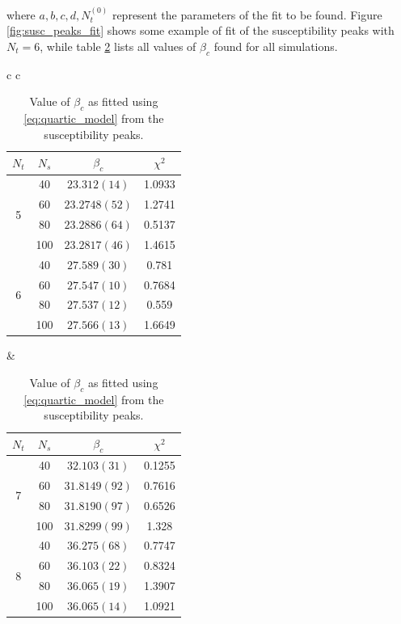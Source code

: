 \documentclass[reqno,12pt]{article}
\numberwithin{equation}{section}
\begin{document}
where $a,b,c,d,N_t^{(0)}$ represent the parameters of the fit to be found. Figure \ref{fig:susc_peaks_fit} shows
some example of fit of the susceptibility peaks with $N_t = 6$, while table \ref{table:beta_c} lists all values
of $\beta_c$ found for all simulations.

\begin{table}[h]
\begin{center}
	\begin{tabular}{c c}
		\begin{tabular}{|c|c|c|c|}
			\hline
			$N_t$ & $N_s$ & $\beta_c$ & $\chi^2$ \\
			\hline
			\multirow{4}{*}{5} 
			& 40  & $23.312(14)$   & 1.0933\\
			& 60  & $23.2748(52)$ & 1.2741 \\
			& 80  & $23.2886(64)$ & 0.5137 \\
			& 100 & $23.2817(46)$ & 1.4615 \\
			\hline
			\multirow{4}{*}{6} 
			& 40  & $27.589(30)$  & 0.781 \\
			& 60  & $27.547(10)$  & 0.7684 \\
			& 80  & $27.537(12)$ & 0.559 \\
			& 100 & $27.566(13)$ & 1.6649 \\
			\hline
		\end{tabular}
		&
		\begin{tabular}{|c|c|c|c|}
			\hline
			$N_t$ & $N_s$ & $\beta_c$ & $\chi^2$ \\
			\hline
			\multirow{4}{*}{7} 
			& 40  & $32.103(31) $  & 0.1255 \\
			& 60  & $31.8149(92)$ & 0.7616 \\
			& 80  & $31.8190(97)$  & 0.6526 \\
			& 100 & $31.8299(99)$ & 1.328 \\
			\hline
			\multirow{4}{*}{8} 
			& 40  & $36.275(68)$ & 0.7747 \\
			& 60  & $36.103(22)$ & 0.8324 \\
			& 80  & $36.065(19)$ & 1.3907 \\
			& 100 & $36.065(14)$ & 1.0921 \\
			\hline			
		\end{tabular}
	\end{tabular}
\end{center}
\caption[Fitted $\beta_c$]{Value of $\beta_c$ as fitted using \eqref{eq:quartic_model} from the susceptibility peaks.}
\label{table:beta_c}
\end{table}
\end{document}
